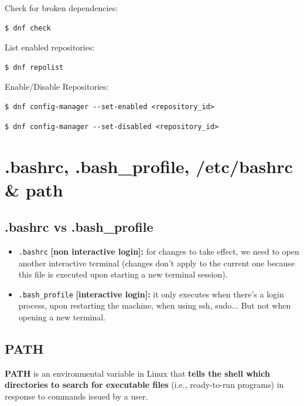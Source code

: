 \documentclass{article}
\newenvironment{codetemplate}[1][]{%
  \mybasecolorbox[#1]
  \itshape
}{%
  \endmybasecolorbox
}
\begin{document}
Check for broken dependencies:
\begin{codetemplate}
\begin{verbatim}
$ dnf check
\end{verbatim}
\end{codetemplate}

List enabled repositories:
\begin{codetemplate}
\begin{verbatim}
$ dnf repolist
\end{verbatim}
\end{codetemplate}

Enable/Disable Repositories:
\begin{codetemplate}
\begin{verbatim}
$ dnf config-manager --set-enabled <repository_id>
\end{verbatim}
\end{codetemplate}
\begin{codetemplate}
\begin{verbatim}
$ dnf config-manager --set-disabled <repository_id>
\end{verbatim}
\end{codetemplate}

\newpage
\section{.bashrc, .bash\_profile, /etc/bashrc \& path}

\subsection{.bashrc vs .bash\_profile}

\begin{itemize}
    \item \verb|.bashrc| \textbf{[non interactive login]:} for changes to take effect, we need to open another interactive terminal (changes don't apply to the current one because this file is executed upon starting a new terminal session).
    \item \verb|.bash_profile| \textbf{[interactive login]:} it only executes when there's a login process, upon restarting the machine, when using ssh, sudo... But not when opening a new terminal.
\end{itemize}

\subsection{PATH}
\textbf{PATH} is an environmental variable in Linux that \textbf{tells the shell which directories to search for executable files} (i.e., ready-to-run programs) in response to commands issued by a user.
\end{document}
